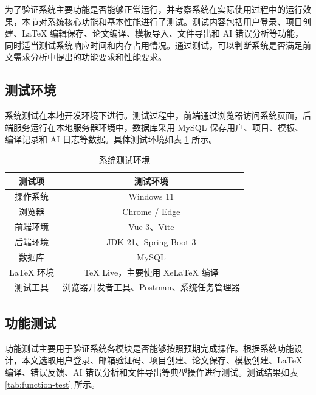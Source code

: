 \documentclass{xduugthesis}
\begin{document}
为了验证系统主要功能是否能够正常运行，并考察系统在实际使用过程中的运行效果，本节对系统核心功能和基本性能进行了测试。测试内容包括用户登录、项目创建、LaTeX 编辑保存、论文编译、模板导入、文件导出和 AI 错误分析等功能，同时适当测试系统响应时间和内存占用情况。通过测试，可以判断系统是否满足前文需求分析中提出的功能要求和性能要求。

\subsection{测试环境}

系统测试在本地开发环境下进行。测试过程中，前端通过浏览器访问系统页面，后端服务运行在本地服务器环境中，数据库采用 MySQL 保存用户、项目、模板、编译记录和 AI 日志等数据。具体测试环境如表 \ref{tab:test-environment} 所示。

\begin{table}[!ht]
    \centering
    \caption{系统测试环境}
    \label{tab:test-environment}
    \begin{tabular}{|c|c|}
        \hline
        测试项 & 测试环境 \\
        \hline
        操作系统 & Windows 11 \\
        \hline
        浏览器 & Chrome / Edge \\
        \hline
        前端环境 & Vue 3、Vite \\
        \hline
        后端环境 & JDK 21、Spring Boot 3 \\
        \hline
        数据库 & MySQL \\
        \hline
        LaTeX 环境 & TeX Live，主要使用 XeLaTeX 编译 \\
        \hline
        测试工具 & 浏览器开发者工具、Postman、系统任务管理器 \\
        \hline
    \end{tabular}
\end{table}

\subsection{功能测试}

功能测试主要用于验证系统各模块是否能够按照预期完成操作。根据系统功能设计，本文选取用户登录、邮箱验证码、项目创建、论文保存、模板创建、LaTeX 编译、错误反馈、AI 错误分析和文件导出等典型操作进行测试。测试结果如表 \ref{tab:function-test} 所示。
\end{document}
